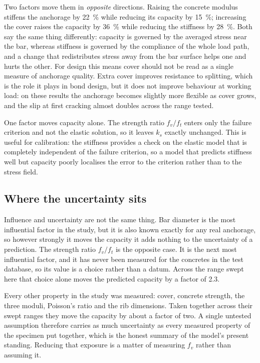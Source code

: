 Two factors move them in \emph{opposite} directions. Raising the concrete
modulus stiffens the anchorage by \SI{22}{\percent} while reducing its
capacity by \SI{15}{\percent}; increasing the cover raises the capacity by
\SI{36}{\percent} while reducing the stiffness by \SI{28}{\percent}. Both
say the same thing differently: capacity is governed by the averaged stress
near the bar, whereas stiffness is governed by the compliance of the whole
load path, and a change that redistributes stress away from the bar surface
helps one and hurts the other. For design this means cover should not be
read as a single measure of anchorage quality. Extra cover improves
resistance to splitting, which is the role it plays in bond design, but it
does not improve behaviour at working load: on these results the anchorage
becomes slightly more flexible as cover grows, and the slip at first
cracking almost doubles across the range tested.
 
One factor moves capacity alone. The strength ratio $f_v/f_t$ enters only
the failure criterion and not the elastic solution, so it leaves $k_s$
exactly unchanged. This is useful for calibration: the stiffness provides a
check on the elastic model that is completely independent of the failure
criterion, so a model that predicts stiffness well but capacity poorly
localises the error to the criterion rather than to the stress field.
 
\subsection{Where the uncertainty sits}
 
Influence and uncertainty are not the same thing. Bar diameter is the most
influential factor in the study, but it is also known exactly for any real
anchorage, so however strongly it moves the capacity it adds nothing to the
uncertainty of a prediction. The strength ratio $f_v/f_t$ is the opposite
case. It is the next most influential factor, and it has never been
measured for the concretes in the test database, so its value is a choice
rather than a datum. Across the range swept here that choice alone moves
the predicted capacity by a factor of \num{2.3}.

Every other property in the study was measured: cover, concrete strength,
the three moduli, Poisson's ratio and the rib dimensions. Taken together
across their swept ranges they move the capacity by about a factor of two.
A single untested assumption therefore carries as much uncertainty as every
measured property of the specimen put together, which is the honest summary
of the model's present standing. Reducing that exposure is a matter of
measuring $f_v$ rather than assuming it.
 
